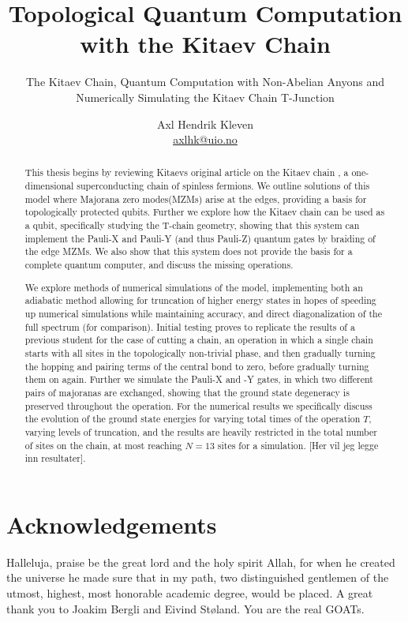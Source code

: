 \documentclass[UKenglish]{uiomasterthesis}
\title{Topological Quantum Computation with the Kitaev Chain}
\subtitle{The Kitaev Chain, Quantum Computation with Non-Abelian Anyons and Numerically Simulating the Kitaev Chain T-Junction}
\author{Axl Hendrik Kleven\\ \url{axlhk@uio.no}}
\begin{document}
\uiomasterfp[kind={Master's thesis}, image={Solen_av_Edvard_Munch[1]}, compact, program = {Theoretical Physics}, supervisors = {Joakim Bergli \ and Eivind Støland} , colour=green, date=\today]  


\begin{abstract}
This thesis begins by reviewing Kitaevs original article on the Kitaev chain \cite{kitaevUnpairedMajoranaFermions2001a}, a one-dimensional superconducting chain of spinless fermions. We outline solutions of this model where Majorana zero modes(MZMs) arise at the edges, providing a basis for topologically protected qubits. Further we explore how the Kitaev chain can be used as a qubit, specifically studying the T-chain geometry, showing that this system can implement the Pauli-X and Pauli-Y (and thus Pauli-Z) quantum gates by braiding of the edge MZMs. We also show that this system does not provide the basis for a complete quantum computer, and discuss the missing operations.

We explore methods of numerical simulations of the model, implementing both an adiabatic method allowing for truncation of higher energy states in hopes of speeding up numerical simulations while maintaining accuracy, and direct diagonalization of the full spectrum (for comparison). Initial testing proves to replicate the results of a previous student for the case of cutting a chain, an operation in which a single chain starts with all sites in the topologically non-trivial phase, and then gradually turning the hopping and pairing terms of the central bond to zero, before gradually turning them on again. Further we simulate the Pauli-X and -Y gates, in which two different pairs of majoranas are exchanged, showing that the ground state degeneracy is preserved throughout the operation. For the numerical results we specifically discuss the evolution of the ground state energies for varying total times of the operation $T$, varying levels of truncation, and the results are heavily restricted in the total number of sites on the chain, at most reaching $N = 13$ sites for a simulation. [Her vil jeg legge inn resultater].
\end{abstract}

\chapter*{Acknowledgements}
Halleluja, praise be the great lord and the holy spirit Allah, for when he created the universe he made sure that in my path, two distinguished gentlemen of the utmost, highest, most honorable academic degree, would be placed. A great thank you to Joakim Bergli and Eivind Støland. You are the real GOATs. 
\end{document}
